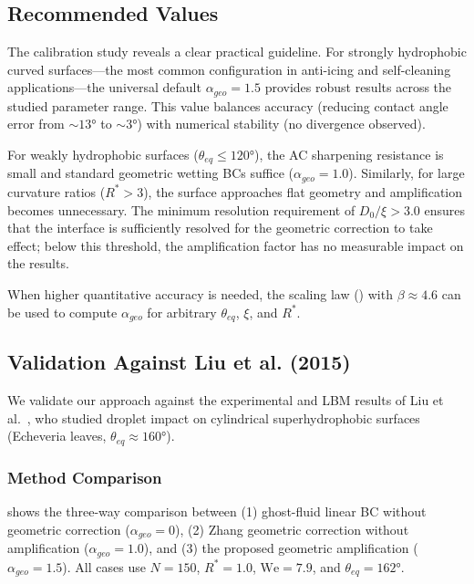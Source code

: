 \subsection{Recommended Values}

The calibration study reveals a clear practical guideline. For strongly hydrophobic curved surfaces---the most common configuration in anti-icing and self-cleaning applications---the universal default $\alpha_{geo} = 1.5$ provides robust results across the studied parameter range. This value balances accuracy (reducing contact angle error from $\sim 13°$ to $\sim 3°$) with numerical stability (no divergence observed).

For weakly hydrophobic surfaces ($\theta_{eq} \leq 120°$), the AC sharpening resistance is small and standard geometric wetting BCs suffice ($\alpha_{geo} = 1.0$). Similarly, for large curvature ratios ($R^* > 3$), the surface approaches flat geometry and amplification becomes unnecessary. The minimum resolution requirement of $D_0/\xi > 3.0$ ensures that the interface is sufficiently resolved for the geometric correction to take effect; below this threshold, the amplification factor has no measurable impact on the results.

When higher quantitative accuracy is needed, the scaling law () with $\beta \approx 4.6$ can be used to compute $\alpha_{geo}$ for arbitrary $\theta_{eq}$, $\xi$, and $R^*$.

\subsection{Validation Against Liu et al. (2015)}

We validate our approach against the experimental and LBM results of Liu et al.~\cite{liu2015symmetry}, who studied droplet impact on cylindrical superhydrophobic surfaces (Echeveria leaves, $\theta_{eq} \approx 160°$).

\subsubsection{Method Comparison}

 shows the three-way comparison between (1) ghost-fluid linear BC without geometric correction ($\alpha_{geo}=0$), (2) Zhang geometric correction without amplification ($\alpha_{geo}=1.0$), and (3) the proposed geometric amplification ($\alpha_{geo}=1.5$). All cases use $N=150$, $R^*=1.0$, $\mathrm{We}=7.9$, and $\theta_{eq}=162°$.

